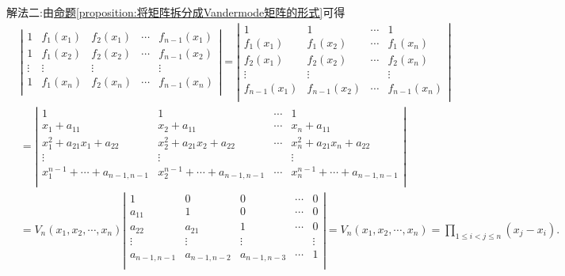 \documentclass[../../main.tex]{subfiles}%
\begin{document}
\begin{solution}
{\color{blue}解法二:}由\hyperref[proposition:将矩阵拆分成Vandermode矩阵的形式]{命题\ref{proposition:将矩阵拆分成Vandermode矩阵的形式}}可得
\begin{align*}
&\left| \begin{matrix}
1&		f_1(x_1)&		f_2(x_1)&		\cdots&		f_{n-1}(x_1)\\
1&		f_1(x_2)&		f_2(x_2)&		\cdots&		f_{n-1}(x_2)\\
\vdots&		\vdots&		\vdots&		&		\vdots\\
1&		f_1(x_n)&		f_2(x_n)&		\cdots&		f_{n-1}(x_n)\\
\end{matrix} \right|=\left| \begin{matrix}
1&		1&		\cdots&		1\\
f_1(x_1)&		f_1(x_2)&		\cdots&		f_1(x_n)\\
f_2(x_1)&		f_2(x_2)&		\cdots&		f_2(x_n)\\
\vdots&		\vdots&		&		\vdots\\
f_{n-1}(x_1)&		f_{n-1}(x_2)&		\cdots&		f_{n-1}(x_n)\\
\end{matrix} \right|
\\
&=\left| \begin{matrix}
1&		1&		\cdots&		1\\
x_1+a_{11}&		x_2+a_{11}&		\cdots&		x_n+a_{11}\\
x_{1}^{2}+a_{21}x_1+a_{22}&		x_{2}^{2}+a_{21}x_2+a_{22}&		\cdots&		x_{n}^{2}+a_{21}x_n+a_{22}\\
\vdots&		\vdots&		&		\vdots\\
x_{1}^{n-1}+\cdots +a_{n-1,n-1}&		x_{2}^{n-1}+\cdots +a_{n-1,n-1}&		\cdots&		x_{n}^{n-1}+\cdots +a_{n-1,n-1}\\
\end{matrix} \right|
\\
&=V_n\left( x_1,x_2,\cdots ,x_n \right) \left| \begin{matrix}
1&		0&		0&		\cdots&		0\\
a_{11}&		1&		0&		\cdots&		0\\
a_{22}&		a_{21}&		1&		\cdots&		0\\
\vdots&		\vdots&		\vdots&		&		\vdots\\
a_{n-1,n-1}&		a_{n-1,n-2}&		a_{n-1,n-3}&		\cdots&		1\\
\end{matrix} \right|=V_n\left( x_1,x_2,\cdots ,x_n \right) =\prod_{1\leqslant i<j\leqslant n}{\left( x_j-x_i \right) .}
\end{align*}

\end{solution}
\end{document}
